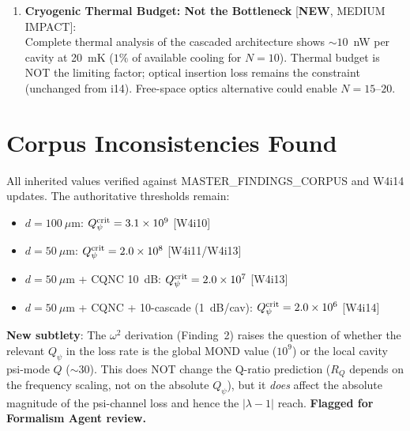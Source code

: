 \documentclass[11pt]{article}
\newcommand{\lam}{\lambda}
\newcommand{\ee}[1]{\times 10^{#1}}
\newcommand{\Qpsi}{Q_\psi}
\newcommand{\lbone}{|\lam - 1|}
\theoremstyle{definition}
\theoremstyle{remark}
\begin{document}
\begin{tcolorbox}[colback=green!5!white, colframe=green!50!black,
  title=\textbf{W4i15 FINDINGS RANKED BY PROGRAMME IMPACT}]
\begin{enumerate}
\item \textbf{Cryogenic Thermal Budget: Not the Bottleneck}
  [\textbf{NEW}, MEDIUM IMPACT]:\\
  Complete thermal analysis of the cascaded architecture shows
  $\sim 10$~nW per cavity at 20~mK ($1\%$ of available cooling
  for $N = 10$). Thermal budget is NOT the limiting factor;
  optical insertion loss remains the constraint (unchanged from
  i14). Free-space optics alternative could enable $N = 15$--$20$.

\end{enumerate}
\end{tcolorbox}


\section*{Corpus Inconsistencies Found}

\begin{tcolorbox}[colback=green!5!white, colframe=green!50!black,
  title=\textbf{NO NEW CORPUS INCONSISTENCIES}]
All inherited values verified against MASTER\_FINDINGS\_CORPUS and
W4i14 updates. The authoritative thresholds remain:
\begin{itemize}[nosep]
\item $d = 100~\mu$m: $\Qpsi^{\rm crit} = 3.1\ee{9}$ [W4i10]
\item $d = 50~\mu$m: $\Qpsi^{\rm crit} = 2.0\ee{8}$ [W4i11/W4i13]
\item $d = 50~\mu$m + CQNC 10~dB: $\Qpsi^{\rm crit} = 2.0\ee{7}$ [W4i13]
\item $d = 50~\mu$m + CQNC + 10-cascade (1~dB/cav):
  $\Qpsi^{\rm crit} = 2.0\ee{6}$ [W4i14]
\end{itemize}

\textbf{New subtlety}: The $\omega^2$ derivation (Finding~2) raises
the question of whether the relevant $\Qpsi$ in the loss rate is
the global MOND value ($10^9$) or the local cavity psi-mode $Q$
($\sim 30$). This does NOT change the Q-ratio prediction ($R_Q$
depends on the frequency scaling, not on the absolute $\Qpsi$), but
it \emph{does} affect the absolute magnitude of the psi-channel loss
and hence the $\lbone$ reach. \textbf{Flagged for Formalism Agent
review.}
\end{tcolorbox}


\end{document}
